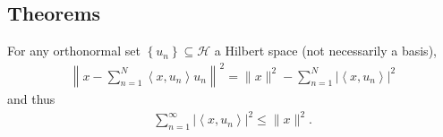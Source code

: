\hypertarget{theorems-3}{%
\subsection{Theorems}\label{theorems-3}}

\begin{theorem}

For any orthonormal set
\(\left\{{u_{n}}\right\} \subseteq {\mathcal{H}}\) a Hilbert space (not
necessarily a basis),
\begin{align*}
\left\|x-\sum_{n=1}^{N}\left\langle x, u_{n}\right\rangle u_{n}\right\|^{2}=\|x\|^{2}-\sum_{n=1}^{N}\left|\left\langle x, u_{n}\right\rangle\right|^{2}
\end{align*}
and thus
\begin{align*}
\sum_{n=1}^{\infty}\left|\left\langle x, u_{n}\right\rangle\right|^{2} \leq\|x\|^{2}
.\end{align*}

\end{theorem}

